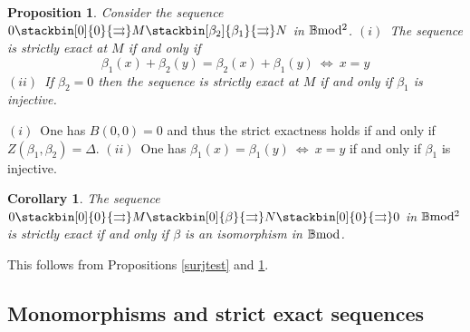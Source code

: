 \documentclass[12pt]{article}
\newtheorem{prop}[thm]{Proposition}
\newtheorem{cor}[thm]{Corollary}
\def\B{{\mathbb B}}
\def\strg{strict }
\def\strgly{strictly }
\def\bmod{{\rm \B mod}}
\def\bm2{{\rm \B mod^2}}
\begin{document}
\begin{prop}\label{injtest} Consider the sequence $0 \stackbin[0]{0}{\rightrightarrows}M\stackbin[\beta_2]{\beta_1}{\rightrightarrows}N$ in $\bm2$. \newline
$(i)$~The sequence is  \strgly exact at $M$ if and only if $$\beta_1(x)+\beta_2(y)=\beta_2(x)+\beta_1(y)~\Leftrightarrow~ x=y$$  
$(ii)$~If $\beta_2=0$ then the sequence is  \strgly exact at $M$ if and only if $\beta_1$ is injective. 
\end{prop}
\proof $(i)$~One has $B(0,0)=0$ and thus the \strg exactness holds if and only if $Z(\beta_1,\beta_2)=\Delta$.
\newline
$(ii)$~One has $\beta_1(x)=\beta_1(y)~\Leftrightarrow~ x=y$ if and only if $\beta_1$ is injective. \endproof 
\begin{cor}\label{isotest}
	The sequence $0 \stackbin[0]{0}{\rightrightarrows}M\stackbin[0]{\beta}{\rightrightarrows}N\stackbin[0]{0}{\rightrightarrows}0$ in $\bm2$ is  \strgly exact if and only if $\beta$ is an isomorphism in $\bmod$.
\end{cor}
\proof This follows from Propositions \ref{surjtest} and \ref{injtest}.\endproof



\subsection{Monomorphisms and \strg exact sequences}\label{sectmeaningst}
\end{document}
